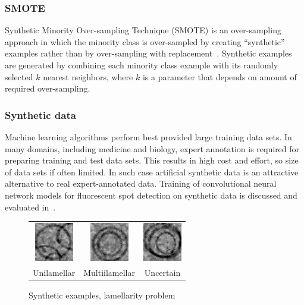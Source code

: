 \documentclass[a4paper, 11pt, table]{article}
\begin{document}
\subsubsection{SMOTE}
Synthetic Minority Over-sampling Technique (SMOTE) is an over-sampling approach in which the minority class is over-sampled by creating “synthetic” examples rather than by over-sampling with replacement~\cite{smote_chawla}. 
Synthetic examples are generated by combining each minority class example with its randomly selected $k$ nearest neighbors, where $k$ is a parameter that depends on amount of required over-sampling.

\subsubsection{Synthetic data}
Machine learning algorithms perform best provided large training data sets. In many domains, including medicine and biology, expert annotation is required for preparing training and test data sets. This results in high cost and effort, so size of data sets if often limited. In such case artificial synthetic data is an attractive alternative to real expert-annotated data. Training of convolutional neural network models for fluorescent spot detection on synthetic data is discussed and evaluated in~\cite{ishaq_synthetic}. 

\begin{figure}[H]
\centering
\begin{tabular}{ccc}
	\includegraphics[scale=1.5]{synthetic/uni.png} & \includegraphics[scale=1.5]{synthetic/multi.png} & \includegraphics[scale=1.5]{synthetic/uncertain.png} \\
	Unilamellar & Multiilamellar & Uncertain \\[6pt]
\end{tabular}
\caption{Synthetic examples, lamellarity problem}
\label{fig:synthetic_images}
\end{figure}
\end{document}
